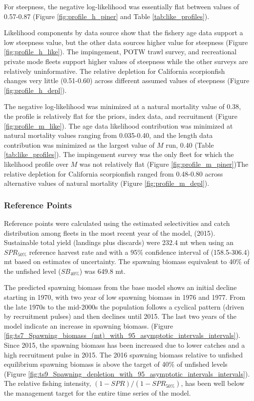\documentclass[12pt,]{article}
\begin{document}
For steepness, the negative log-likelihood was essentially flat between
values of 0.57-0.87 (Figure \ref{fig:profile_h_piner} and Table
\ref{tab:like_profiles}).

Likelihood components by data source show that the fishery age data
support a low steepness value, but the other data sources higher value
for steepness (Figure \ref{fig:profile_h_like}). The impingement, POTW
trawl survey, and recreational private mode fleets support higher values
of steepness while the other surveys are relatively uninformative. The
relative depletion for California scorpionfish changes very little
(0.51-0.60) across different assumed values of steepness (Figure
\ref{fig:profile_h_depl}).

The negative log-likelihood was minimized at a natural mortality value
of 0.38, the profile is relatively flat for the priors, index data, and
recruitment (Figure \ref{fig:profile_m_like}). The age data likelihood
contribution was minimized at natural mortality values ranging from
0.035-0.40, and the length data contribution was minimized as the
largest value of \(M\) run, 0.40 (Table \ref{tab:like_profiles}). The
impingement survey was the only fleet for which the likelihood profile
over \(M\) was not relatively flat (Figure \ref{fig:profile_m_piner})The
relative depletion for California scorpionfish ranged from 0.48-0.80
across alternative values of natural mortality (Figure
\ref{fig:profile_m_depl}).

\subsubsection{Reference Points}\label{reference-points-1}

Reference points were calculated using the estimated selectivities and
catch distribution among fleets in the most recent year of the model,
(2015). Sustainable total yield (landings plus discards) were 232.4 mt
when using an \(SPR_{50\%}\) reference harvest rate and with a 95\%
confidence interval of (158.5-306.4) mt based on estimates of
uncertainty. The spawning biomass equivalent to 40\% of the unfished
level (\(SB_{40\%}\)) was 649.8 mt.

The predicted spawning biomass from the base model shows an initial
decline starting in 1970, with two year of low spawning biomass in 1976
and 1977. From the late 1970s to the mid-2000s the population follows a
cyclical pattern (driven by recruitment pulses) and then declines until
2015. The last two years of the model indicate an increase in spawning
biomass. (Figure
\ref{fig:ts7_Spawning_biomass_(mt)_with_95_asymptotic_intervals_intervals}).
Since 2015, the spawning biomass has been increased due to lower catches
and a high recruitment pulse in 2015. The 2016 spawning biomass relative
to unfished equilibrium spawning biomass is above the target of 40\% of
unfished levels (Figure
\ref{fig:ts9_Spawning_depletion_with_95_asymptotic_intervals_intervals}).
The relative fishing intensity, \((1-SPR)/(1-SPR_{50\%})\), has been
well below the management target for the entire time series of the
model.
\end{document}
